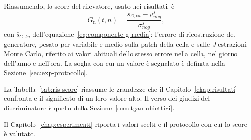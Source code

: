 Riassumendo, lo score del rilevatore, usato nei risultati, è
\begin{equation}
G_{\mathrm{n}}(t,n)=\frac{\bar{s}_{G,tn}-\mu^{s}_{nog}}{\sigma^{s}_{nog}},
\label{eq:score-finale}
\end{equation}
con $\bar{s}_{G,tn}$ dell'equazione~\eqref{eq:componente-g-media}: l'errore di ricostruzione del generatore, pesato per variabile e medio sulla patch della cella e sulle $J$ estrazioni Monte Carlo, riferito ai valori abituali dello stesso errore nella cella, nel giorno dell'anno e nell'ora. La soglia con cui un valore è segnalato è definita nella Sezione~\ref{sec:exp-protocollo}.

La Tabella~\ref{tab:ris-score} riassume le grandezze che il Capitolo~\ref{chap:risultati} confronta e il significato di un loro valore alto. Il verso dei giudizi del discriminatore è quello della Sezione~\ref{sec:stgan-obiettivi}.

Il Capitolo~\ref{chap:esperimenti} riporta i valori scelti e il protocollo con cui lo score è valutato.

